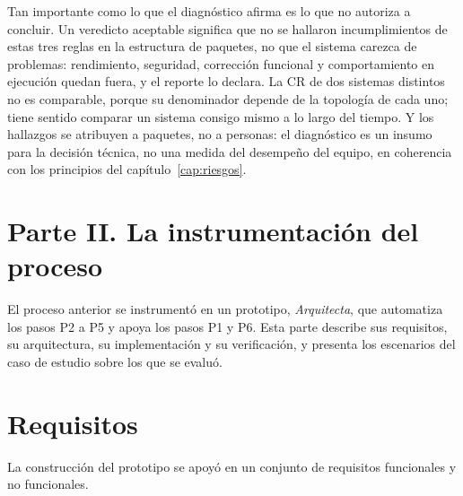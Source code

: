 Tan importante como lo que el diagnóstico afirma es lo que no autoriza a concluir. Un veredicto aceptable significa que no se hallaron incumplimientos de estas tres reglas en la estructura de paquetes, no que el sistema carezca de problemas: rendimiento, seguridad, corrección funcional y comportamiento en ejecución quedan fuera, y el reporte lo declara. La CR de dos sistemas distintos no es comparable, porque su denominador depende de la topología de cada uno; tiene sentido comparar un sistema consigo mismo a lo largo del tiempo. Y los hallazgos se atribuyen a paquetes, no a personas: el diagnóstico es un insumo para la decisión técnica, no una medida del desempeño del equipo, en coherencia con los principios del capítulo~\ref{cap:riesgos}.

\section*{Parte II. La instrumentación del proceso}

El proceso anterior se instrumentó en un prototipo, \textit{Arquitecta}, que automatiza los pasos P2 a P5 y apoya los pasos P1 y P6. Esta parte describe sus requisitos, su arquitectura, su implementación y su verificación, y presenta los escenarios del caso de estudio sobre los que se evaluó.

\section{Requisitos}
La construcción del prototipo se apoyó en un conjunto de requisitos funcionales y no funcionales.

